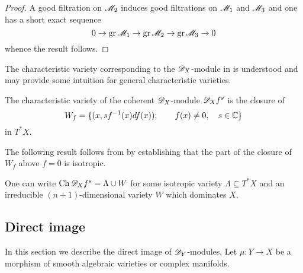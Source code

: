 \begin{proof}
  A good filtration on $\mathscr{M}_2$ induces good filtrations on $\mathscr{M}_1$ and $\mathscr{M}_3$ and one has a short exact sequence
  $$0\to \operatorname{gr} \mathscr{M}_1 \to \operatorname{gr} \mathscr{M}_2 \to \operatorname{gr} \mathscr{M}_3 \to 0 $$
  whence the result follows.
\end{proof}
The characteristic variety corresponding to the $\mathscr{D}_X$-module in  is understood and may provide some intuition for general characteristic varieties.
\begin{proposition}{{\cite[Theorem 5.3]{kashiwara1976b}}}\label{prop: Charfs}
  The characteristic variety of the coherent $\mathscr{D}_X$-module $\mathscr{D}_Xf^s$ is the closure of
  $$W_f = \{(x,sf^{-1}(x)df(x)); \qquad f(x)\neq 0,\quad s\in \mathbb{C} \}$$
  in $T^*X$.
\end{proposition}
The following result follows from  by establishing that the part of the closure of $W_f$ above $f=0$ is isotropic.
\begin{proposition}{{\cite[Proposition 5.6]{kashiwara1976b}}}\label{prop: IsotropicAndDominate}
  One can write $\operatorname{Ch} \mathscr{D}_X f^s = \Lambda \cup W$ for some isotropic variety $\Lambda \subseteq T^*X$ and an irreducible $(n+1)$-dimensional variety $W$ which dominates $X$.
\end{proposition}
\subsection{Direct image}
In this section we describe the direct image of $\mathscr{D}_Y$-modules.
Let $\mu:Y\to X$ be a morphism of smooth algebraic varieties or complex manifolds.

